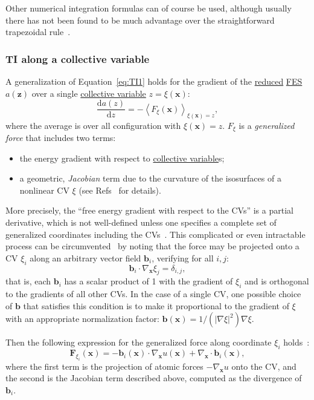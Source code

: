 \documentclass[9pt,review]{livecoms}
\newcommand{\vx}{\mathbf{x}}
\newcommand{\vz}{\mathbf{z}}
\newcommand{\vF}{\mathbf{F}}
\newcommand{\vb}{\mathbf{b}}
\begin{document}
Other numerical integration formulas can of course be used, although usually there has not been found to be much advantage over the straightforward trapezoidal rule~\cite{Paliwal_comparison_2011}.


\subsubsection{TI along a collective variable}

A generalization of Equation~\ref{eq:TI1} holds for the gradient of the \hyperlink{ref:reduced} {reduced} \hyperlink{ref:FES} {FES} $a(\vz)$ over a single \hyperlink{ref:CV} {collective variable} $z = \xi(\vx)$:
\begin{equation}
\frac{\mathrm{d} a(z)}{\mathrm{d} z} = - \left\langle F_\xi(\vx)  \right\rangle_{\xi(\vx) = z},
    \label{eq:TI_CV}
\end{equation}
where the average is over all configuration with $\xi(\vx) = z$.
$F_\xi$ is a \textit{generalized force} that includes two terms:
\begin{itemize}
    \item the energy gradient with respect to \hyperlink{ref:CV} {collective variable}s;
    \item a geometric, \textit{Jacobian} term due to the curvature of the isosurfaces of a nonlinear CV $\xi$ (see Refs~\cite{lelievre-rousset-stoltz-07-a, Henin2010a, Comer2015} for details).
\end{itemize}

More precisely, the ``free energy gradient with respect to the CVs'' is a partial derivative, which is not well-defined unless one specifies a complete set of generalized coordinates including the CVs~\cite{Henin2004}.
This complicated or even intractable process can be circumvented~\cite{denOtter2000, Ciccotti2005} by noting that the force may be projected onto a CV $\xi_i$ along an arbitrary vector field  $\vb_i$, verifying for all $i,j$:
\begin{equation}
    \vb_i \cdot \nabla_\vx \xi_j = \delta_{i,j},
\end{equation}
that is, each $\vb_i$ has a scalar product of 1 with the gradient of $\xi_i$ and is orthogonal to the gradients of all other CVs.
In the case of a single CV, one possible choice of $\vb$ that satisfies this condition is to make it proportional to the gradient of $\xi$ with an appropriate normalization factor:
$ \vb(\vx) = 1/(|\nabla \xi|^2) \nabla \xi$.

Then the following expression for the generalized force along coordinate $\xi_i$ holds~\cite{Ciccotti2005}:
\begin{equation}
\label{eq:TI_Ciccotti}
\vF_{\xi_i}(\vx) = - \vb_i(\vx) \cdot \nabla_\vx u(\vx) + \nabla_\vx \cdot \vb_i(\vx),
\end{equation}
where the first term is the projection of atomic forces $-\nabla_\vx u$ onto the CV, and the second is the Jacobian term described above, computed as the divergence of $\vb_i$.
\end{document}
